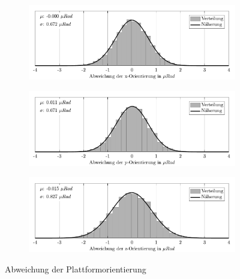 \begin{figure}[H]
    \centering
    \begin{subfigure}[b]{\textwidth}
    \includegraphics{graphics/results/drift/fig_drift_axis_rx.pdf}
    \end{subfigure}
    \begin{subfigure}[b]{\textwidth}
    \includegraphics{graphics/results/drift/fig_drift_axis_ry.pdf}
    \end{subfigure}
    \begin{subfigure}[b]{\textwidth}
    \includegraphics{graphics/results/drift/fig_drift_axis_rz.pdf}
    \end{subfigure}
    \caption[Abweichung der Plattformorientierung]{Abweichung der Plattformorientierung}\label{fig:results_drift_r}
\end{figure}
\blindtext[1]
